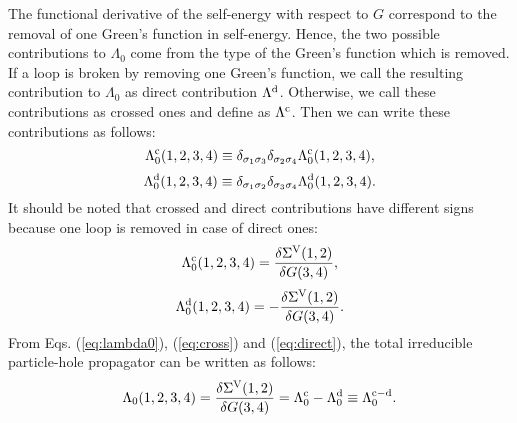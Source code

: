 The functional derivative of the self-energy with respect to $G$ 
correspond to the removal of one Green's function in self-energy. 
Hence, the two possible contributions to $\Lambda_0$ come from
the type of the Green's function which is removed.
If a loop is broken by removing one Green's function, we call
the resulting contribution to $\Lambda_0$ as direct contribution $\Lambda^{\rm d}$.
Otherwise, we call these contributions as crossed ones and define as $\Lambda^{\rm c}$.
Then we can write these contributions as follows:
%
\begin{equation}
	\Lambda^{\rm c}_0(1,2,3,4) \equiv \delta_{\sigma_1\sigma_3}
	\delta_{\sigma_2\sigma_4}\Lambda^{\rm c}_0(1,2,3,4),
	\label{eq:defcross}
\end{equation}
%
\begin{equation}
	\Lambda^{\rm d}_0(1,2,3,4) \equiv \delta_{\sigma_1\sigma_2}
	\delta_{\sigma_3\sigma_4}\Lambda^{\rm d}_0(1,2,3,4).
	\label{eq:defdirect}
\end{equation}
%
It should be noted that crossed and direct contributions have different 
signs because one loop is removed in case of direct ones:
%
\begin{equation}
	\Lambda^{\rm c}_0(1,2,3,4) = \frac{\delta\Sigma^{\rm V}(1,2)}
	{\delta G(3,4)}, 
	\label{eq:cross}
\end{equation}
%
\begin{equation}
	\Lambda^{\rm d}_0(1,2,3,4) = -\frac{\delta\Sigma^{\rm V}(1,2)}
	{\delta G(3,4)}.
	\label{eq:direct}
\end{equation}
%
From Eqs. (\ref{eq:lambda0}), (\ref{eq:cross}) and (\ref{eq:direct}), 
the total irreducible particle-hole propagator can be written as follows:
%
\begin{equation}
	\Lambda_0(1,2,3,4) = \frac{\delta\Sigma^{\rm V}(1,2)}{\delta G(3,4)}
	= \Lambda^{\rm c}_0 - \Lambda^{\rm d}_0 \equiv \Lambda^{{\rm c} - {\rm d}}_0.
	\label{eq:lambdadiff}
\end{equation}
%
\begin{figure}[h]
\end{figure}
